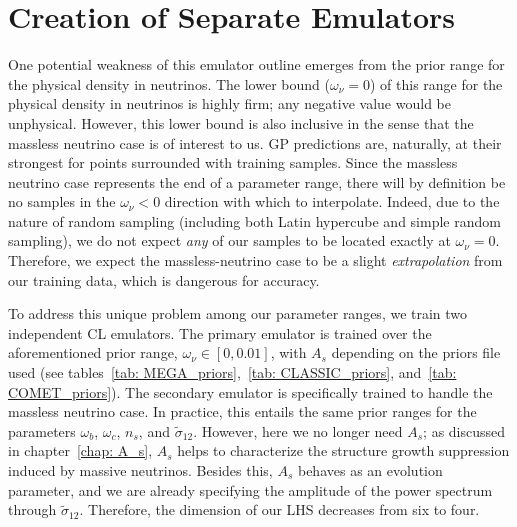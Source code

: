 \section{Creation of Separate Emulators}
\label{sec: 2emu_intro}

One potential weakness of this emulator outline emerges 
from the prior range for the physical density in neutrinos. The lower bound 
($\omega_\nu = 0$) of this range for the physical density in neutrinos is 
highly firm; any negative value would be unphysical. However, this 
lower bound is also inclusive in the sense that the massless neutrino case is  
of interest to us. GP predictions are, naturally, at their 
strongest for points surrounded with training samples. Since the massless 
neutrino case represents the end of a parameter range, there will by 
definition be no samples in the $\omega_\nu < 0$ direction with which to
interpolate. Indeed, due to the nature of random sampling (including both 
Latin hypercube and simple random sampling), we do not expect \textit{any}
of our
samples to be located exactly at $\omega_\nu = 0$.
Therefore, we expect the massless-neutrino case to be a slight
\textit{extrapolation} from our training data, which is dangerous for 
accuracy.

\begin{comment}
\footnote{\textcolor{orange}{What should I say to people who complain: 
``why not just manually add massless-neutrino samples to the original training 
set? Why not simply have one emulator trained over a more diverse training 
set?'' I think it would be better if we simply focus on the $\omega_\nu = 0$
case not being adequately captured by interpolation, since we don't have any
samples on the ``left'' side of $\omega_\nu = 0$.}}
\end{comment}

To address this unique problem among our parameter ranges, we train two
independent CL emulators. The primary 
emulator is trained over the aforementioned prior range,
$\omega_\nu \in [0, 0.01]$, with $A_s$ depending on the priors file used
(see tables~\ref{tab: MEGA_priors},~\ref{tab: CLASSIC_priors},
and~\ref{tab: COMET_priors}). The secondary emulator is specifically trained
to handle the massless neutrino case. In 
practice, this entails the same prior ranges for the parameters $\omega_b$, 
$\omega_c$, $n_s$, and $\tilde{\sigma}_{12}$. However, here we no longer need 
$A_s$;
as discussed in chapter~\ref{chap: A_s}, $A_s$ helps to characterize the
structure growth suppression induced by massive neutrinos. Besides this,
$A_s$ behaves as an evolution parameter, and we are already specifying the 
amplitude of the power spectrum through $\tilde{\sigma}_{12}$. Therefore, the
dimension of our LHS decreases from six to four.


